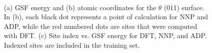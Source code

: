\documentclass{article}
\begin{document}
\begin{figure}[H]%
\centering%
%
%
\\
%
\caption{(a) GSF energy and (b) atomic coordinates for the $\theta$ (0$\overline{1}$1) surface. 
In (b), each black dot represents a point of calculation for NNP and ADP, while the red numbered dots are sites that were computed with DFT.
(c) Site index vs. GSF energy for DFT, NNP, and ADP.
Indexed sites are included in the training set.}
\label{fig:GSF_Theta_0m11}
\end{figure}
\end{document}
